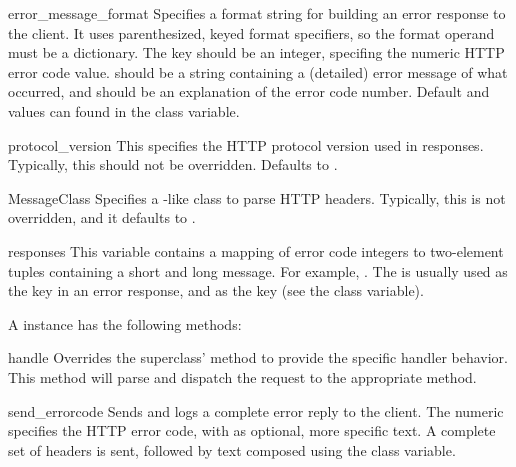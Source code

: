 \begin{datadesc}{error_message_format}
Specifies a format string for building an error response to the
client. It uses parenthesized, keyed format specifiers, so the
format operand must be a dictionary. The  key should
be an integer, specifing the numeric HTTP error code value.
 should be a string containing a (detailed) error
message of what occurred, and  should be an
explanation of the error code number. Default 
and  values can found in the 
class variable.
\end{datadesc}

\begin{datadesc}{protocol_version}
This specifies the HTTP protocol version used in responses.
Typically, this should not be overridden. Defaults to
.
\end{datadesc}

\begin{datadesc}{MessageClass}
Specifies a -like class to parse HTTP
headers. Typically, this is not overridden, and it defaults to
.
\end{datadesc}

\begin{datadesc}{responses}
This variable contains a mapping of error code integers to two-element
tuples containing a short and long message. For example,
. The
 is usually used as the  key in an
error response, and  as the  key
(see the  class variable).
\end{datadesc}


A  instance has the following methods:

\begin{funcdesc}{handle}{}
Overrides the superclass'  method to provide the
specific handler behavior. This method will parse and dispatch
the request to the appropriate  method.
\end{funcdesc}

\begin{funcdesc}{send_error}{code}
Sends and logs a complete error reply to the client. The numeric
 specifies the HTTP error code, with  as
optional, more specific text. A complete set of headers is sent,
followed by text composed using the 
class variable.
\end{funcdesc}


